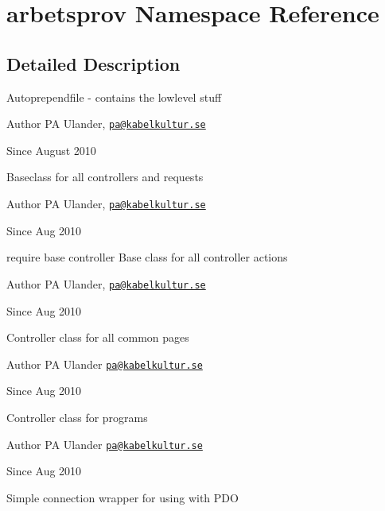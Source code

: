\hypertarget{namespacearbetsprov}{\section{arbetsprov Namespace Reference}
\label{namespacearbetsprov}
}


\subsection{Detailed Description}
Autoprependfile -\/ contains the lowlevel stuff

\begin{DoxyAuthor}{Author}
P\-A Ulander, \href{mailto:pa@kabelkultur.se}{\tt pa@kabelkultur.\-se} 
\end{DoxyAuthor}
\begin{DoxySince}{Since}
August 2010
\end{DoxySince}
Baseclass for all controllers and requests

\begin{DoxyAuthor}{Author}
P\-A Ulander, \href{mailto:pa@kabelkultur.se}{\tt pa@kabelkultur.\-se} 
\end{DoxyAuthor}
\begin{DoxySince}{Since}
Aug 2010
\end{DoxySince}
require base controller Base class for all controller actions

\begin{DoxyAuthor}{Author}
P\-A Ulander, \href{mailto:pa@kabelkultur.se}{\tt pa@kabelkultur.\-se} 
\end{DoxyAuthor}
\begin{DoxySince}{Since}
Aug 2010
\end{DoxySince}
Controller class for all common pages

\begin{DoxyAuthor}{Author}
P\-A Ulander \href{mailto:pa@kabelkultur.se}{\tt pa@kabelkultur.\-se} 
\end{DoxyAuthor}
\begin{DoxySince}{Since}
Aug 2010
\end{DoxySince}
Controller class for programs

\begin{DoxyAuthor}{Author}
P\-A Ulander \href{mailto:pa@kabelkultur.se}{\tt pa@kabelkultur.\-se} 
\end{DoxyAuthor}
\begin{DoxySince}{Since}
Aug 2010
\end{DoxySince}
Simple connection wrapper for using with P\-D\-O

